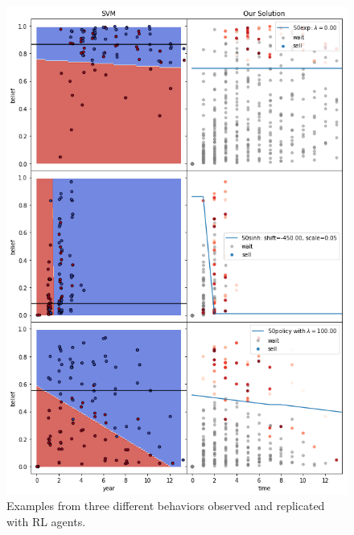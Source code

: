 \begin{figure}
    \includegraphics[width=0.8\linewidth]{img/fit.png}
\caption{Examples from three different behaviors observed and replicated with RL agents.}
\end{figure}
